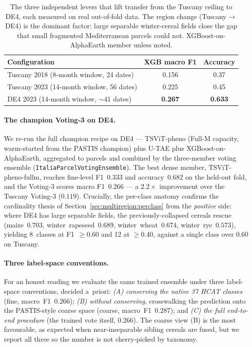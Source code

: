 \begin{table}[t]
  \centering
  \caption{The three independent levers that lift transfer from the Tuscany ceiling to DE4,
  each measured on real out-of-fold data. The region change (Tuscany$\rightarrow$DE4) is the
  dominant factor: large separable winter-cereal fields close the gap that small fragmented
  Mediterranean parcels could not. XGBoost-on-AlphaEarth member unless noted.}
  \label{tab:de4_levers}
  \begin{tabular}{lcc}
    \toprule
    Configuration & XGB macro F1 & Accuracy \\
    \midrule
    Tuscany 2018 (8-month window, 24 dates)   & 0.156 & 0.37 \\
    Tuscany 2023 (14-month window, 56 dates)  & 0.225 & 0.45 \\
    DE4 2023 (14-month window, $\sim$41 dates) & \textbf{0.267} & \textbf{0.633} \\
    \bottomrule
  \end{tabular}
\end{table}

\paragraph{The champion Voting-3 on DE4.}
We re-run the full champion recipe on DE4 --- TSViT-pheno (Full-M capacity, warm-started from
the PASTIS champion) plus U-TAE plus XGBoost-on-AlphaEarth, aggregated to parcels and
combined by the three-member voting ensemble (\texttt{ItaliaParcelVotingEnsemble}). The
best dense member, TSViT-pheno-fullm, reaches fine-level F1~$0.333$ and accuracy~$0.682$ on
the held-out fold, and the Voting-3 scores macro F1~$0.266$ %
--- a $2.2\times$ improvement over the Tuscany Voting-3 ($0.119$). Crucially, the per-class
anatomy confirms the cardinality thesis of Section~\ref{sec:multiregion:perclass} from the
\emph{positive} side: where DE4 has large separable fields, the previously-collapsed cereals
rescue (maize~$0.703$, winter~rapeseed~$0.689$, winter~wheat~$0.674$, winter~rye~$0.573$),
yielding 8~classes at F1~$\ge0.60$ and 12 at $\ge0.40$, against a single class over $0.60$ on
Tuscany. %

\paragraph{Three label-space conventions.}
For an honest reading we evaluate the same trained ensemble under three label-space
conventions, decided a~priori: \emph{(A) conserving the native 37 HCAT classes}
(fine, macro~F1~$0.266$); \emph{(B) without conserving}, crosswalking the prediction onto the
PASTIS-style coarse space (coarse, macro~F1~$0.287$); and \emph{(C) the full end-to-end
procedure} (the trained vote itself, $0.266$). %
The coarse view (B) is the most favourable, as expected when near-inseparable sibling cereals
are fused, but we report all three so the number is not cherry-picked by taxonomy.

